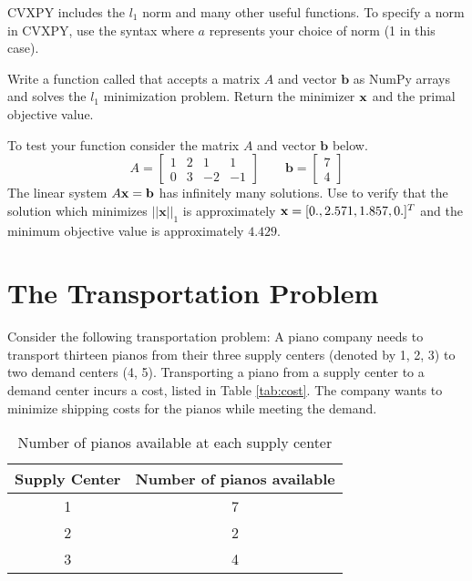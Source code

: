 CVXPY includes the $l_1$ norm and many other useful functions.
To specify a norm in CVXPY, use the syntax  where $a$ represents your choice of norm (1 in this case).

\begin{problem}
Write a function called  that accepts a matrix $A$ and vector $\mathbf{b}$ as NumPy arrays and solves the $l_1$ minimization problem.
Return the minimizer $\mathbf{x}$ and the primal objective value.

To test your function consider the matrix $A$ and vector $\mathbf{b}$ below.
\[
A = \begin{bmatrix}
1 & 2 & 1 & 1\\
0 & 3 & -2 & -1
\end{bmatrix} \qquad
\mathbf{b} = \begin{bmatrix}
7 \\
4
\end{bmatrix}
\]
The linear system $A\mathbf{x} = \mathbf{b}$ has infinitely many solutions.
Use  to verify that the solution which minimizes $||\mathbf{x}||_1$ is approximately $\mathbf{x} = [0., 2.571, 1.857, 0.]^T$ and the minimum objective value is approximately $4.429$.
\label{prob:l1}
\end{problem}

\section*{The Transportation Problem}

Consider the following transportation problem:
A piano company needs to transport thirteen pianos from their three  supply centers (denoted by 1, 2, 3) to two demand centers (4, 5).
Transporting a piano from a supply center to a demand center incurs a cost, listed in Table \ref{tab:cost}.
The company wants to minimize shipping costs for the pianos while meeting the demand.

\begin{table}[H]
\centering
\begin{tabular}{|c|c|}
Supply Center & Number of pianos available\\
\hline
1 & 7\\
2 & 2\\
3 & 4\\
\end{tabular}

\caption{Number of pianos available at each supply center}
\label{tab:supply}
\end{table}

